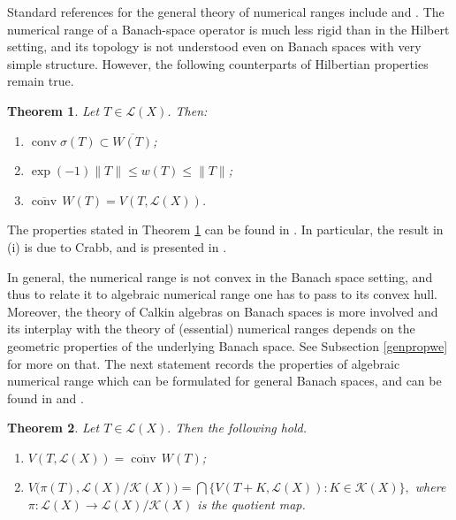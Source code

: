 \documentclass[11pt]{amsart}
\numberwithin{equation}{section}
\newtheorem{theorem}{Theorem}[section]
\theoremstyle{definition}
\theoremstyle{remark}
\DeclareMathOperator{\conv}{conv}
\begin{document}
Standard references for the general theory of numerical ranges include
\cite{BD1} and \cite{BD2}. The numerical range of a Banach-space operator
is much less rigid than in the Hilbert setting, and its topology is not
understood even on Banach spaces with very simple structure.
However, the following counterparts of Hilbertian properties remain true.

\begin{theorem}\label{ThW}
Let $T\in \mathcal L(X)$. Then:
\begin{enumerate}[label=\textup{(\roman*)}]
\item $\conv\sigma(T)\subset \overline{W(T)}$;
\item $\exp(-1)\|T\|\le w(T)\le \|T\|$;
\item $\overline{\conv}\, W(T)=V(T,\mathcal L(X))$.
\end{enumerate}
\end{theorem}
The properties stated in Theorem \ref{ThW} can be found in \cite{BD1, BD2}.
In particular, the result in (i) is due to Crabb, and is presented in \cite[Theorem 3, p.22]{BD2}.

In general, the numerical range is not convex in the Banach space setting, and thus to relate it to algebraic numerical range one has to pass to its convex hull. Moreover, the theory of Calkin algebras on Banach spaces is more involved 
and its interplay with the theory of (essential) numerical ranges depends on the geometric properties of the underlying Banach space. See Subsection \ref{genpropwe} for more on that.
The next statement records the properties of algebraic numerical range which can be formulated for general Banach spaces,
and can be found  in \cite[Chapter 3, \S9]{BD1} and \cite[Chapter 7, \S34]{BD2}.
\begin{theorem}\label{vrange}
Let $T\in \mathcal L(X).$ Then the following hold.
\begin{enumerate}[label=\textup{(\roman*)}]
\item $V(T,\mathcal L(X))=\overline{\conv}\, W(T)$;
\item  $V\bigl(\pi(T),\mathcal L(X)/\mathcal K(X)\bigr)
=\bigcap\{V(T+K,\mathcal L(X)): K\in \mathcal K(X)\},$
where \(\pi:\mathcal L(X)\to\mathcal L(X)/\mathcal K(X)\) is the quotient map.
\end{enumerate}
\end{theorem}
\end{document}

